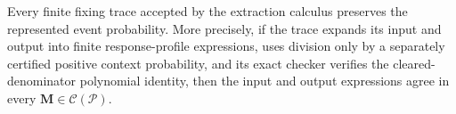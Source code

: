 Every finite fixing trace accepted by the extraction calculus preserves the represented event probability.  More precisely, if the trace expands its input and output into finite response-profile expressions, uses division only by a separately certified positive context probability, and its exact checker verifies the cleared-denominator polynomial identity, then the input and output expressions agree in every \(\mathbf M\in\mathcal C(\mathcal P)\).